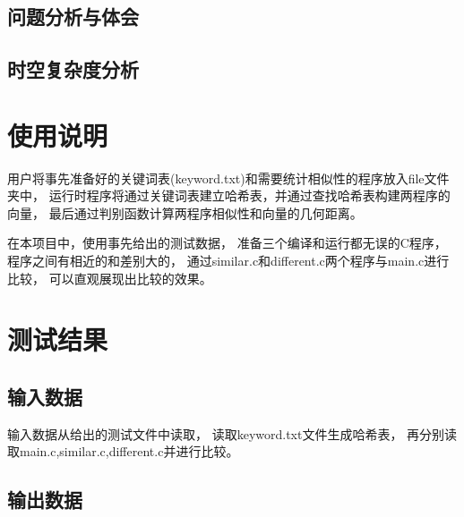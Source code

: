 \documentclass[a4paper]{article}
\begin{document}
    \subsection{问题分析与体会}\label{subsec:analysis}

    \subsection{时空复杂度分析}\label{subsec:analysis2}


    \section{使用说明}\label{sec:instrut}
    {{用户将事先准备好的关键词表(keyword.txt)和需要统计相似性的程序放入file文件夹中，
    运行时程序将通过关键词表建立哈希表，并通过查找哈希表构建两程序的向量，
    最后通过判别函数计算两程序相似性和向量的几何距离。}}

    {{在本项目中，使用事先给出的测试数据，
    准备三个编译和运行都无误的C程序，程序之间有相近的和差别大的，
    通过similar.c和different.c两个程序与main.c进行比较，
    可以直观展现出比较的效果。}}


    \section{测试结果}\label{sec:result}

    \subsection{输入数据}\label{subsec:in}
    {{输入数据从给出的测试文件中读取，
    读取keyword.txt文件生成哈希表，
    再分别读取main.c,similar.c,different.c并进行比较。}}

    \subsection{输出数据}\label{subsec:out}






\end{document}

